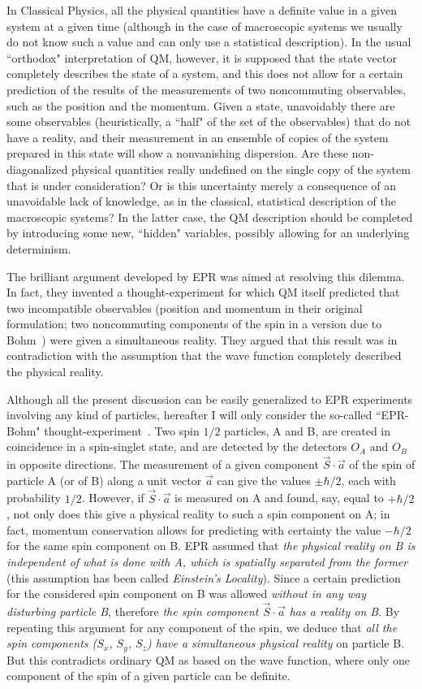 \documentclass[12pt]{article}
\begin{document}
In Classical Physics, all the physical quantities have a definite
value in a given system at a given time (although in the case of
macroscopic systems we usually do not know such a value and can only
use a statistical description). In the usual ``orthodox"
interpretation of QM, however, it is supposed that the state vector
completely describes the state of a system, and this does not allow
for a certain prediction of the results of the measurements of two
noncommuting observables, such as the position and the momentum. Given
a state, unavoidably there are some observables (heuristically, a
``half" of the set of the observables) that do not have a reality, and
their measurement in an ensemble of copies of the system prepared in
this state will show a nonvanishing dispersion. Are these
non-diagonalized physical quantities really undefined on the single
copy of the system that is under consideration? Or is this uncertainty
merely a consequence of an unavoidable lack of knowledge, as in the
classical, statistical description of the macroscopic systems? In the
latter case, the QM description should be completed by introducing
some new, ``hidden" variables, possibly allowing for an underlying
determinism.

The brilliant argument developed by EPR was aimed at resolving this
dilemma. In fact, they invented a thought-experiment for which QM
itself predicted that two incompatible observables (position and
momentum in their original formulation; two noncommuting components of
the spin in a version due to Bohm~\cite{Bohm}) were given a
simultaneous reality. They argued that this result was in
contradiction with the assumption that the wave function completely
described the physical reality.

Although all the present discussion can be easily generalized to EPR
experiments involving any kind of particles, hereafter I will only
consider the so-called ``EPR-Bohm"
thought-experiment~\cite{Bohm,pureprp}. Two spin $1/2$ particles, A
and B, are created in coincidence in a spin-singlet state, and are
detected by the detectors $O_A$ and $O_B$ in opposite directions. The
measurement of a given component $\vec S\cdot\vec a$ of the spin of
particle A (or of B) along a unit vector $\vec a$ can give the values
$\pm\hbar/2$, each with probability $1/2$. However, if $\vec
S\cdot\vec a$ is measured on A and found, say, equal to $+\hbar/2$,
not only does this give a physical reality to such a spin component on
A; in fact, momentum conservation allows for predicting with certainty
the value $-\hbar/2$ for the same spin component on B. EPR assumed
that \emph{the physical reality on B is independent of what is done
with A, which is spatially separated from the former} (this assumption
has been called \emph{Einstein's Locality}). Since a certain
prediction for the considered spin component on B was allowed
\emph{without in any way disturbing particle B}, therefore \emph{the
spin component $\vec S\cdot\vec a$ has a reality on B}. By repeating
this argument for any component of the spin, we deduce that \emph{all
the spin components ($S_x$, $S_y$, $S_z$) have a simultaneous physical
reality} on particle B.  But this contradicts ordinary QM as based on
the wave function, where only one component of the spin of a given
particle can be definite.
\end{document}

